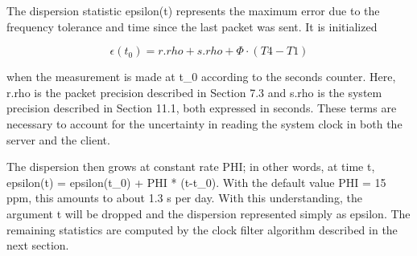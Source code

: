 The dispersion statistic epsilon(t) represents the maximum error due
to the frequency tolerance and time since the last packet was sent.
It is initialized

$$
\epsilon(t_0) = r.rho + s.rho + \Phi \cdot (T4 - T1)
$$

when the measurement is made at t\_0 according to the seconds counter.
Here, r.rho is the packet precision described in Section 7.3 and
s.rho is the system precision described in Section 11.1, both
expressed in seconds. These terms are necessary to account for the
uncertainty in reading the system clock in both the server and the
client.

The dispersion then grows at constant rate PHI; in other words, at
time t, epsilon(t) = epsilon(t\_0) + PHI * (t-t\_0). With the default
value PHI = 15 ppm, this amounts to about 1.3 s per day. With this
understanding, the argument t will be dropped and the dispersion
represented simply as epsilon. The remaining statistics are computed
by the clock filter algorithm described in the next section.
